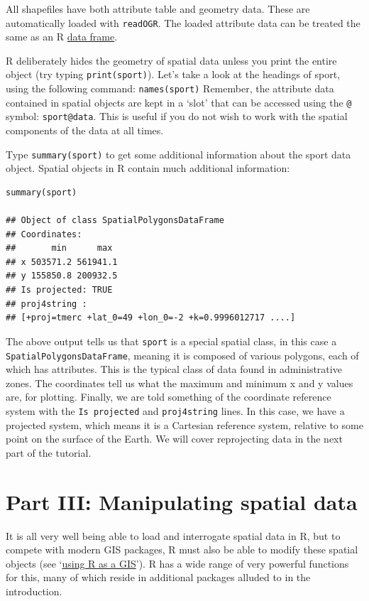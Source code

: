 \documentclass[]{article}
\begin{document}
All shapefiles have both attribute table and geometry data. These are
automatically loaded with \texttt{readOGR}. The loaded attribute data
can be treated the same as an R
\href{http://www.statmethods.net/input/datatypes.html}{data frame}.

R deliberately hides the geometry of spatial data unless you print the
entire object (try typing \texttt{print(sport)}). Let's take a look at
the headings of sport, using the following command:
\texttt{names(sport)} Remember, the attribute data contained in spatial
objects are kept in a `slot' that can be accessed using the \texttt{@}
symbol: \texttt{sport@data}. This is useful if you do not wish to work
with the spatial components of the data at all times.

Type \texttt{summary(sport)} to get some additional information about
the sport data object. Spatial objects in R contain much additional
information:

\begin{verbatim}
summary(sport)

## Object of class SpatialPolygonsDataFrame
## Coordinates:
##       min      max
## x 503571.2 561941.1
## y 155850.8 200932.5
## Is projected: TRUE 
## proj4string :
## [+proj=tmerc +lat_0=49 +lon_0=-2 +k=0.9996012717 ....]
\end{verbatim}

The above output tells us that \texttt{sport} is a special spatial
class, in this case a \texttt{SpatialPolygonsDataFrame}, meaning it is
composed of various polygons, each of which has attributes. This is the
typical class of data found in administrative zones. The coordinates
tell us what the maximum and minimum x and y values are, for plotting.
Finally, we are told something of the coordinate reference system with
the \texttt{Is projected} and \texttt{proj4string} lines. In this case,
we have a projected system, which means it is a Cartesian reference
system, relative to some point on the surface of the Earth. We will
cover reprojecting data in the next part of the tutorial.

\section{Part III: Manipulating spatial
data}\label{part-iii-manipulating-spatial-data}

It is all very well being able to load and interrogate spatial data in
R, but to compete with modern GIS packages, R must also be able to
modify these spatial objects (see
`\href{https://github.com/Pakillo/R-GIS-tutorial}{using R as a GIS}'). R
has a wide range of very powerful functions for this, many of which
reside in additional packages alluded to in the introduction.
\end{document}
